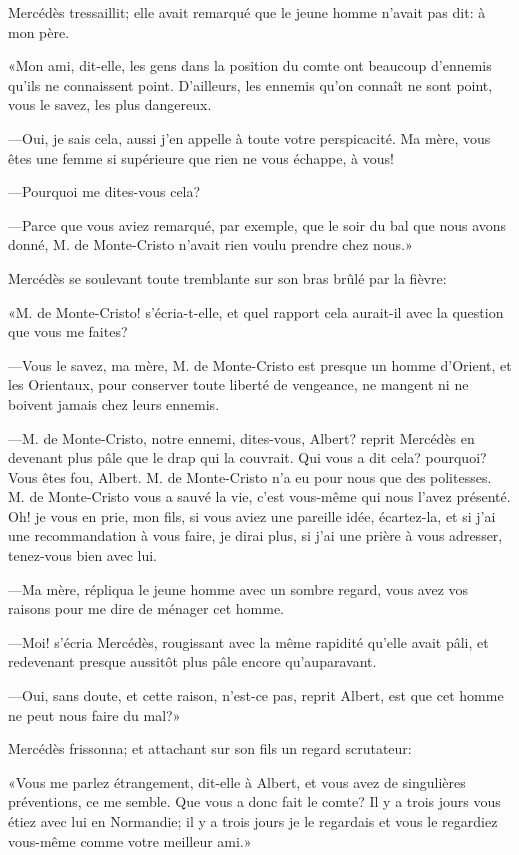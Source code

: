 Mercédès tressaillit; elle avait remarqué que le jeune homme n'avait pas dit: à mon père. 

«Mon ami, dit-elle, les gens dans la position du comte ont beaucoup d'ennemis qu'ils ne connaissent point. D'ailleurs, les ennemis qu'on connaît ne sont point, vous le savez, les plus dangereux. 

—Oui, je sais cela, aussi j'en appelle à toute votre perspicacité. Ma mère, vous êtes une femme si supérieure que rien ne vous échappe, à vous! 

—Pourquoi me dites-vous cela? 

—Parce que vous aviez remarqué, par exemple, que le soir du bal que nous avons donné, M. de Monte-Cristo n'avait rien voulu prendre chez nous.» 

Mercédès se soulevant toute tremblante sur son bras brûlé par la fièvre: 

«M. de Monte-Cristo! s'écria-t-elle, et quel rapport cela aurait-il avec la question que vous me faites? 

—Vous le savez, ma mère, M. de Monte-Cristo est presque un homme d'Orient, et les Orientaux, pour conserver toute liberté de vengeance, ne mangent ni ne boivent jamais chez leurs ennemis. 

—M. de Monte-Cristo, notre ennemi, dites-vous, Albert? reprit Mercédès en devenant plus pâle que le drap qui la couvrait. Qui vous a dit cela? pourquoi? Vous êtes fou, Albert. M. de Monte-Cristo n'a eu pour nous que des politesses. M. de Monte-Cristo vous a sauvé la vie, c'est vous-même qui nous l'avez présenté. Oh! je vous en prie, mon fils, si vous aviez une pareille idée, écartez-la, et si j'ai une recommandation à vous faire, je dirai plus, si j'ai une prière à vous adresser, tenez-vous bien avec lui. 

—Ma mère, répliqua le jeune homme avec un sombre regard, vous avez vos raisons pour me dire de ménager cet homme. 

—Moi! s'écria Mercédès, rougissant avec la même rapidité qu'elle avait pâli, et redevenant presque aussitôt plus pâle encore qu'auparavant. 

—Oui, sans doute, et cette raison, n'est-ce pas, reprit Albert, est que cet homme ne peut nous faire du mal?» 

Mercédès frissonna; et attachant sur son fils un regard scrutateur: 

«Vous me parlez étrangement, dit-elle à Albert, et vous avez de singulières préventions, ce me semble. Que vous a donc fait le comte? Il y a trois jours vous étiez avec lui en Normandie; il y a trois jours je le regardais et vous le regardiez vous-même comme votre meilleur ami.» 

